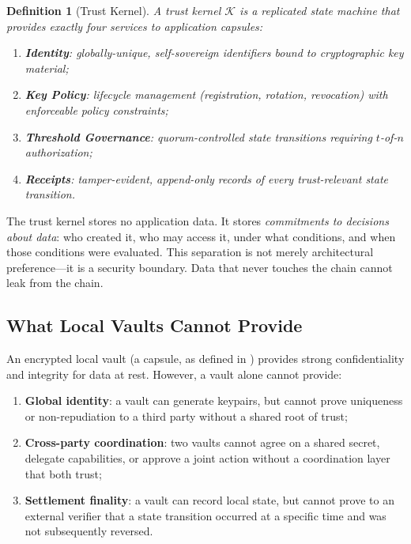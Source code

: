 \documentclass[11pt,a4paper]{article}
\newtheorem{definition}{Definition}[section]
\begin{document}
\begin{definition}[Trust Kernel]\label{def:trust-kernel}
A trust kernel $\mathcal{K}$ is a replicated state machine that provides exactly
four services to application capsules:
\begin{enumerate}[label=(\alph*)]
    \item \textbf{Identity}: globally-unique, self-sovereign identifiers bound to
          cryptographic key material;
    \item \textbf{Key Policy}: lifecycle management (registration, rotation,
          revocation) with enforceable policy constraints;
    \item \textbf{Threshold Governance}: quorum-controlled state transitions
          requiring $t$-of-$n$ authorization;
    \item \textbf{Receipts}: tamper-evident, append-only records of every
          trust-relevant state transition.
\end{enumerate}
\end{definition}

The trust kernel stores no application data. It stores \emph{commitments to decisions
about data}: who created it, who may access it, under what conditions, and when those
conditions were evaluated. This separation is not merely architectural preference---it
is a security boundary. Data that never touches the chain cannot leak from the chain.

\subsection{What Local Vaults Cannot Provide}

An encrypted local vault (a capsule, as defined in \cite{lux-capsule-architecture})
provides strong confidentiality and integrity for data at rest. However, a vault alone
cannot provide:

\begin{enumerate}[label=(\roman*)]
    \item \textbf{Global identity}: a vault can generate keypairs, but cannot prove
          uniqueness or non-repudiation to a third party without a shared root of trust;
    \item \textbf{Cross-party coordination}: two vaults cannot agree on a shared secret,
          delegate capabilities, or approve a joint action without a coordination layer
          that both trust;
    \item \textbf{Settlement finality}: a vault can record local state, but cannot
          prove to an external verifier that a state transition occurred at a specific
          time and was not subsequently reversed.
\end{enumerate}
\end{document}
